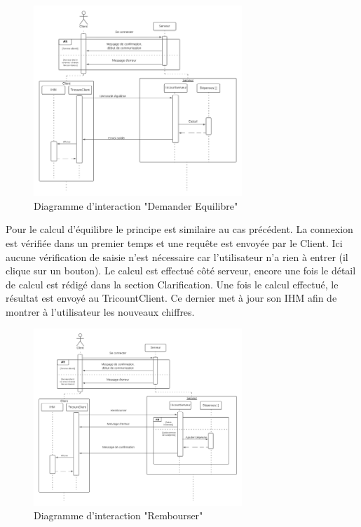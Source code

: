 \documentclass[12,french]{report}
\begin{document}
\begin{figure}[H]
	\center
	\includegraphics[width=0.7\textwidth]{./Images/Interaction_DemanderEquilibre}
	\caption{Diagramme d'interaction "Demander Equilibre"}
\end{figure}\vspace{0.2cm}

Pour le calcul d'équilibre le principe est similaire au cas précédent. La connexion est vérifiée dans un premier temps et une requête est envoyée par le Client. Ici aucune vérification de saisie n'est nécessaire car l'utilisateur n'a rien à entrer (il clique sur un bouton). Le calcul est effectué côté serveur, encore une fois le détail de calcul est rédigé dans la section Clarification. Une fois le calcul effectué, le résultat est envoyé au TricountClient. Ce dernier met à jour son IHM afin de montrer à l'utilisateur les nouveaux chiffres. \\

\begin{figure}[H]
	\center
	\includegraphics[width=0.7\textwidth]{./Images/Interaction_Rembourser}
	\caption{Diagramme d'interaction "Rembourser"}
\end{figure}\vspace{0.2cm}
\end{document}
